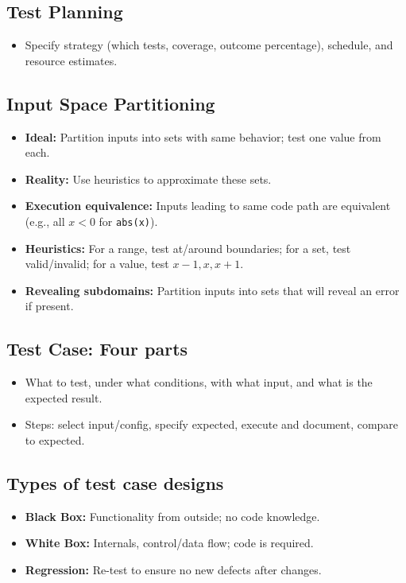 \documentclass[11pt,a4paper]{article}
\begin{document}
\subsection*{Test Planning}
\begin{itemize}
    \item Specify strategy (which tests, coverage, outcome percentage), schedule, and resource estimates.
\end{itemize}

\subsection*{Input Space Partitioning}
\begin{itemize}
    \item \textbf{Ideal:} Partition inputs into sets with same behavior; test one value from each.
    \item \textbf{Reality:} Use heuristics to approximate these sets.
    \item \textbf{Execution equivalence:} Inputs leading to same code path are equivalent (e.g., all $x < 0$ for \texttt{abs(x)}).
    \item \textbf{Heuristics:} For a range, test at/around boundaries; for a set, test valid/invalid; for a value, test $x-1, x, x+1$.
    \item \textbf{Revealing subdomains:} Partition inputs into sets that will reveal an error if present.
\end{itemize}

\subsection*{Test Case: Four parts}
\begin{itemize}
    \item What to test, under what conditions, with what input, and what is the expected result.
    \item Steps: select input/config, specify expected, execute and document, compare to expected.
\end{itemize}

\subsection*{Types of test case designs}
\begin{itemize}
    \item \textbf{Black Box:} Functionality from outside; no code knowledge.
    \item \textbf{White Box:} Internals, control/data flow; code is required.
    \item \textbf{Regression:} Re-test to ensure no new defects after changes.
\end{itemize}
\end{document}
